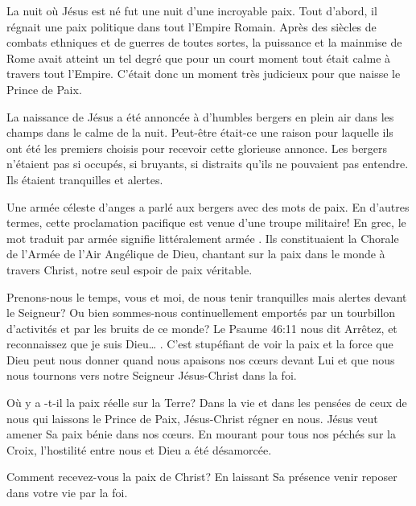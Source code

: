 

La nuit où Jésus est né fut une nuit d'une incroyable paix. Tout d'abord, il régnait une paix politique dans tout l'Empire Romain. Après des siècles de combats ethniques et de guerres de toutes sortes, la puissance et la mainmise de Rome avait atteint un tel degré que pour un court moment tout était calme à travers tout l'Empire. C'était donc un moment très judicieux pour que naisse le Prince de Paix.

La naissance de Jésus a été annoncée à d'humbles bergers en plein air dans les champs dans le calme de la nuit. Peut-être était-ce une raison pour laquelle ils ont été les premiers choisis pour recevoir cette glorieuse annonce. Les bergers n'étaient pas si occupés, si bruyants, si distraits qu'ils ne pouvaient pas entendre. Ils étaient tranquilles et alertes.

Une armée céleste d'anges a parlé aux bergers avec des mots de paix. En d'autres termes, cette proclamation pacifique est venue d'une troupe militaire! En grec, le mot traduit par \og armée \fg{} signifie littéralement \og armée \fg{}. Ils constituaient la Chorale de l'Armée de l'Air Angélique de Dieu, chantant sur la paix dans le monde à travers Christ, notre seul espoir de paix véritable.

Prenons-nous le temps, vous et moi, de nous tenir tranquilles mais alertes devant le Seigneur? Ou bien sommes-nous continuellement emportés par un tourbillon d'activités et par les bruits de ce monde? Le Psaume 46:11 nous dit \og Arrêtez, et reconnaissez que je suis Dieu… \fg{}. C'est stupéfiant de voir la paix et la force que Dieu peut nous donner quand nous apaisons nos cœurs devant Lui et que nous nous tournons vers notre Seigneur Jésus-Christ dans la foi.

Où y a -t-il la paix réelle sur la Terre? Dans la vie et dans les pensées de ceux de nous qui laissons le Prince de Paix, Jésus-Christ régner en nous. Jésus veut amener Sa paix bénie dans nos cœurs. En mourant pour tous nos péchés sur la Croix, l'hostilité entre nous et Dieu a été désamorcée.

Comment recevez-vous la paix de Christ? En laissant Sa présence venir reposer dans votre vie par la foi.



